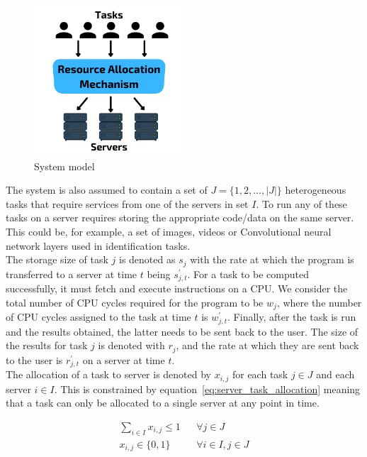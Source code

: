 \begin{figure}
    \centering
    \includegraphics[width=0.5\textwidth]{figures/solution_fig/system_model.pdf}
    \caption{System model}
    \label{fig:system_model}
\end{figure}

The system is also assumed to contain a set of $J = \{1,2,\ldots,\left| J \right|\}$ heterogeneous tasks that require
services from one of the servers in set $I$. To run any of these tasks on a server requires storing the appropriate
code/data on the same server. This could be, for example, a set of images, videos or Convolutional neural network
layers used in identification tasks.\\
The storage size of task $j$ is denoted as $s_j$ with the rate at which the program is transferred to a server at time
$t$ being $s^{'}_{j,t}$. For a task to be computed successfully, it must fetch and execute instructions
on a CPU. We consider the total number of CPU cycles required for the program to be $w_j$, where the number of
CPU cycles assigned to the task at time $t$ is $w^{'}_{j,t}$. Finally, after the task is run and
the results obtained, the latter needs to be sent back to the user. The size of the results for task $j$ is denoted with
$r_j$, and the rate at which they are sent back to the user is $r^{'}_{j,t}$ on a server at time $t$. \\
The allocation of a task to server is denoted by $x_{i,j}$ for each task $j \in J$ and each server $i \in I$. This is
constrained by equation~\eqref{eq:server_task_allocation} meaning that a task can only be allocated to a single server
at any point in time.

\begin{align}
    \sum_{i \in I} x_{i,j} \leq 1 && \forall{j \in J} \label{eq:server_task_allocation} \\
    x_{i,j} \in \{0, 1\} && \forall{i \in I, j \in J} \label{eq:server_task_binary}
\end{align}

